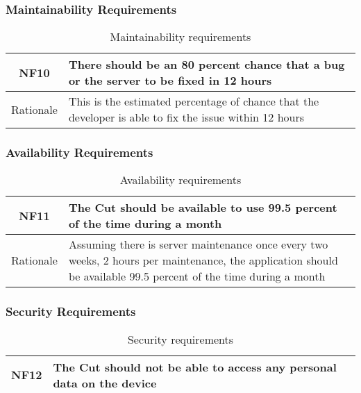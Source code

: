 \documentclass[titlepage]{article}
\begin{document}
\subsubsection{Maintainability Requirements}
\begin{table}[H]
    \centering
    \begin{tabularx}{\textwidth}{|c|X|} \hline
        NF10 & There should be an 80 percent chance that a bug or the server to be fixed in 12 hours \\ \hline
        Rationale & This is the estimated percentage of chance that the developer is able to fix the issue within 12 hours \\ \hline
    \end{tabularx}
    \caption{Maintainability requirements}
    \label{tab:NonFunctional-Maintainability}
\end{table}

\subsubsection{Availability Requirements}
\begin{table}[H]
    \centering
    \begin{tabularx}{\textwidth}{|c|X|} \hline
        NF11 & The Cut should be available to use 99.5 percent of the time during a month \\ \hline
        Rationale & Assuming there is server maintenance once every two weeks, 2 hours per maintenance, the application should be available 99.5 percent of the time during a month \\ \hline
    \end{tabularx}
    \caption{Availability requirements}
    \label{tab:NonFunctional-Availability}
\end{table}

\subsubsection{Security Requirements}
\begin{table}[H]
    \centering
    \begin{tabularx}{\textwidth}{|c|X|} \hline
        NF12 & The Cut should not be able to access any personal data on the device \\ \hline
    \end{tabularx}
    \caption{Security requirements}
    \label{tab:NonFunctional-Security}
\end{table}
\end{document}
